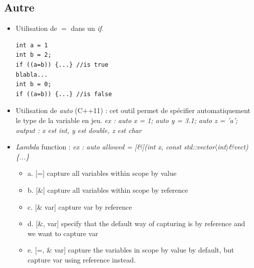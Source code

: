 \documentclass[12pt,a4paper]{article}
\begin{document}
\subsection{Autre}
\begin{itemize}
\item Utilisation de $=$ dans un \textit{if}.
\begin{lstlisting}
int a = 1
int b = 2;
if ((a=b)) {...} //is true
blabla...
int b = 0;
if ((a=b)) {...} //is false
\end{lstlisting}
\item Utilisation de \textit{auto} (C++11) : cet outil permet de spécifier automatiquement le type de la variable en jeu. 
\newline \textit{ex : auto x = 1; auto y = 3.1; auto z = 'a';}
\newline \textit{output : x est int, y est double, z est char}
\item \textit{Lambda} function : \textit{ex : auto allowed = [\&](int x, const std::vector$\langle$int$\rangle$\&vect)\{...\}}
\begin{itemize}
\item a. [=] capture all variables within scope by value
\item b. [\&] capture all variables within scope by reference
\item c. [\& var] capture var by reference
\item d. [\&, var] specify that the default way of capturing is by reference and we want to capture var
\item e. [=, \& var] capture the variables in scope by value by default, but capture var using reference instead.
\end{itemize}
\end{itemize}
\end{document}
